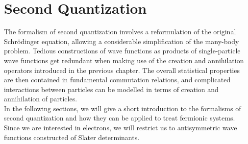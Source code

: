 \section{Second Quantization}
\label{sec:SecQuant}

The formalism of second quantization involves a reformulation of the original Schr\"odinger equation, allowing a considerable simplification of the many-body problem. Tedious constructions of wave functions as products of single-particle wave functions get redundant when making use of the creation and annihilation operators introduced in the previous chapter. The overall statistical properties are then contained in fundamental commutation relations, and complicated interactions between particles can be modelled in terms of creation and annihilation of particles.\\
In the following sections, we will give a short introduction to the formalisms of second quantization and how they can be applied to treat fermionic systems.  Since we are interested in electrons, we will restrict us to antisymmetric wave functions constructed of Slater determinants.


